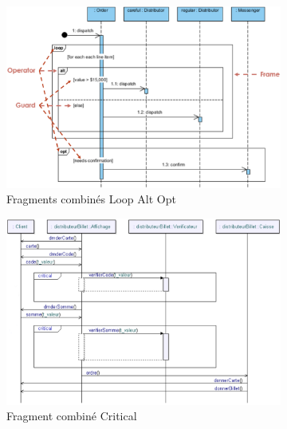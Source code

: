 \begin{figure}[H]
\centering
\begin{subfigure}{0.45\textwidth}
\includegraphics[width=\textwidth]{./Images/Diagrammes/diagram_sequence_ex_fragmentscombines.png}
\caption{Fragments combinés \og Loop Alt Opt\fg}
\label{fig:diagram_sequence_fc_loopaltopt}
\end{subfigure}
\begin{subfigure}{0.45\textwidth}
\includegraphics[width=\textwidth]{./Images/Diagrammes/diagram_sequence_fc_critical.png}
\caption{Fragment combiné \og Critical\fg}
\label{fig:diagram_sequence_fc_critical}
\end{subfigure}
\begin{subfigure}{0.45\textwidth}

\end{subfigure}
\end{figure}
